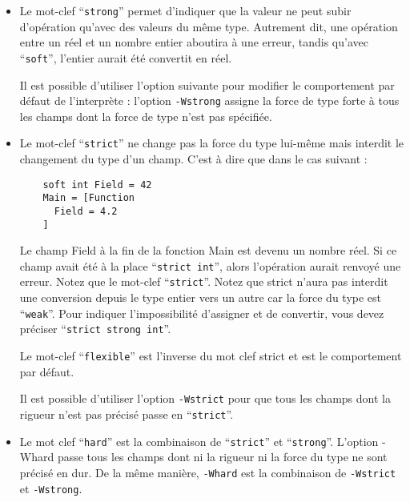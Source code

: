 \documentclass[a5paper, 12pt]{book}
\begin{document}
\begin{itemize}
  \item Le mot-clef ``\verb!strong!'' permet d'indiquer que la valeur ne
    peut subir d'opération qu'avec des valeurs du même type. Autrement dit,
    une opération entre un réel et un nombre entier aboutira à une erreur,
    tandis qu'avec ``\verb!soft!'', l'entier aurait été convertit en réel.

    Il est possible d'utiliser l'option suivante pour modifier le
    comportement par défaut de l'interprète : l'option \verb!-Wstrong!
    assigne la force de type forte à tous les champs dont la force de
    type n'est pas spécifiée.
    \vspace{\baselineskip}

  \item Le mot-clef ``\verb!strict!'' ne change pas la force du type lui-même
    mais interdit le changement du type d'un champ. C'est à dire que dans
    le cas suivant :\\

\begin{verbatim}
    soft int Field = 42
    Main = [Function
      Field = 4.2
    ]
\end{verbatim}
	\vspace{\baselineskip}

    Le champ Field à la fin de la fonction Main est devenu un nombre
    réel. Si ce champ avait été à la place ``\verb!strict int!'', alors
    l'opération aurait renvoyé une erreur. Notez que le mot-clef
    ``\verb!strict!''. Notez que strict n'aura pas interdit une conversion
    depuis le type entier vers un autre car la force du type est
    ``\verb!weak!''. Pour indiquer l'impossibilité d'assigner et de convertir,
    vous devez préciser ``\verb!strict strong int!''.

    Le mot-clef ``\verb!flexible!'' est l'inverse du mot clef strict et
    est le comportement par défaut.

    Il est possible d'utiliser l'option \verb!-Wstrict! pour que tous les champs
    dont la rigueur n'est pas précisé passe en ``\verb!strict!''.
    \vspace{\baselineskip}

  \item Le mot clef ``\verb!hard!'' est la combinaison de ``\verb!strict!'' et ``\verb!strong!''.
    L'option -Whard passe tous les champs dont ni la rigueur ni la force
    du type ne sont précisé en dur. De la même manière, \verb!-Whard! est la
    combinaison de \verb!-Wstrict! et \verb!-Wstrong!.

\end{itemize}
\vspace{\baselineskip}
\end{document}

